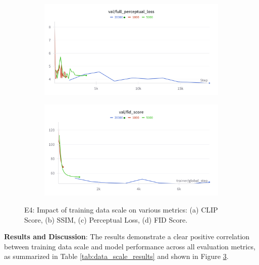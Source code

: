 \begin{figure}[htbp]
  \begin{subfigure}[b]{0.48\textwidth}
    \centering
    \includegraphics[width=\textwidth]{images/experiments/data_scale/perceptual.png}
    \label{fig:exp_data_scale_perceptual}
  \end{subfigure}
  \hfill
  \begin{subfigure}[b]{0.48\textwidth}
    \centering
    \includegraphics[width=\textwidth]{images/experiments/data_scale/fid.png}
    \label{fig:exp_data_scale_fid}
  \end{subfigure}

  \caption{E4: Impact of training data scale on various metrics: (a) CLIP Score, (b) SSIM, (c) Perceptual Loss, (d) FID Score.}
  \label{fig:exp_data_scale_metrics_grid}
\end{figure}

\textbf{Results and Discussion}: The results demonstrate a clear positive correlation between training data scale and model performance across all evaluation metrics, as summarized in Table \ref{tab:data_scale_results} and shown in Figure \ref{fig:exp_data_scale_metrics_grid}.

